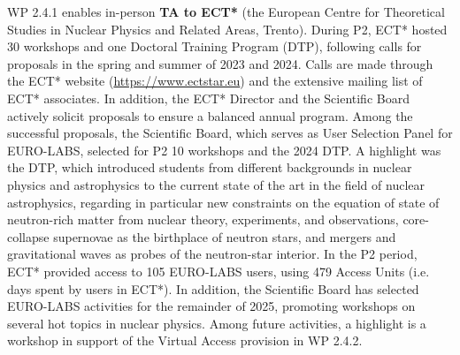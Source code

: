 WP 2.4.1 enables in-person \textbf{TA to ECT*} (the European Centre for Theoretical Studies in Nuclear Physics and Related Areas, Trento). During P2, ECT* hosted 30 workshops and one Doctoral Training Program (DTP), following calls for proposals in the spring and summer of  2023 and 2024. Calls are made through the ECT* website (\url{https://www.ectstar.eu}) and the extensive mailing list of ECT* associates. In addition, the ECT* Director and the Scientific Board actively solicit proposals to ensure a balanced annual program.
Among the successful proposals, the Scientific Board, which serves as User Selection Panel for EURO-LABS, selected for P2 10 workshops and the 2024 DTP.  A highlight was the DTP, which introduced students from different backgrounds in nuclear physics and astrophysics to the current state of the art in the field of nuclear astrophysics, regarding in particular new constraints on the equation of state of neutron-rich matter from nuclear theory, experiments, and observations, core-collapse supernovae as the birthplace of neutron stars, and mergers and gravitational waves as probes of the neutron-star interior. 
In the P2 period, ECT* provided access to 105 EURO-LABS users, using 479 Access Units (i.e. days spent by users in ECT*). In addition, the Scientific Board has selected EURO-LABS activities for the remainder of 2025, promoting workshops on several hot topics in nuclear physics.  
Among future activities, a highlight is a workshop in support of the Virtual Access provision in WP 2.4.2. 



